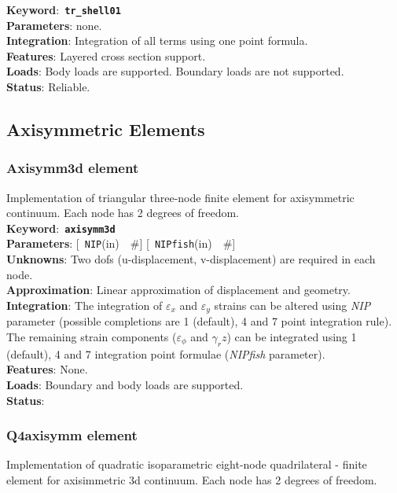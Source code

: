 \documentclass[a4paper]{article}
\newcommand{\descitem}[1]{{\noindent \bf #1}:}
\newcommand{\elemkeyword}[1]{\descitem{Keyword}~{\bf \texttt{#1}}}
\newcommand{\elemparam}[2]{{{\texttt{#1}\tiny (#2)}~~\#}}
\newcommand{\optelemparam}[2]{{[~\elemparam{#1}{#2}]}}
\newcommand{\param}[1]{{\em #1}}
\begin{document}
\elemkeyword{tr\_shell01}\\
\descitem{Parameters} none.\\
\descitem{Integration}
Integration of all terms using one point formula.\\
\descitem{Features} Layered cross section support.\\
\descitem{Loads} Body loads are supported. Boundary loads are
not supported.\\
\descitem{Status} Reliable.


\subsection{Axisymmetric Elements}
\subsubsection{Axisymm3d element}
Implementation of triangular three-node finite element 
for axisymmetric continuum. Each node has 2 degrees of freedom.\\
\elemkeyword{axisymm3d}\\
\descitem{Parameters} \optelemparam{NIP}{in} \optelemparam{NIPfish}{in}\\
\descitem{Unknowns}
Two dofs (u-displacement, v-displacement) are required in each node.\\
\descitem{Approximation} Linear approximation of displacement and
geometry.\\
\descitem{Integration}
The integration of $\varepsilon_x$ and $\varepsilon_y$ strains can be altered using
\param{NIP} parameter (possible completions are 1 (default), 4 and 7
point integration rule). The remaining strain components ($\varepsilon_\phi$ and
$\gamma_rz$) can be integrated using 1 (default), 4 and 7 integration
point formulae (\param{NIPfish} parameter).\\
\descitem{Features} None.\\
\descitem{Loads} Boundary and body loads are supported.\\
\descitem{Status} 

\subsubsection{Q4axisymm element}
Implementation of quadratic isoparametric eight-node quadrilateral -
finite element for axisimmetric 3d continuum. 
Each node has 2 degrees of freedom.
\end{document}
